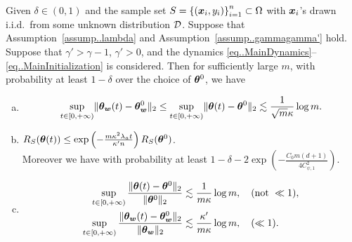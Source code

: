 \documentclass[twoside,11pt]{article}
\begin{document}
\begin{prop}\label{prop..WLazyRegime}
    Given $\delta\in(0,1)$ and the sample set $S = {\{(\bm{x}_i, y_i)\}}_{i=1}^n\subset\Omega$ with $\bm{x}_i$'s drawn i.i.d.\ from some unknown distribution $\mathcal{D}$. Suppose that Assumption~\ref{assump..lambda} and Assumption~\ref{assump..gammagamma'} hold.  Suppose that $\gamma'>\gamma-1$, $\gamma'>0$, and the dynamics \eqref{eq..MainDynamics}--\eqref{eq..MainInitialization} is considered. Then for sufficiently large $m$, with probability at least $1-\delta$ over the choice of $\bm{\theta}^0$, we have
    \begin{enumerate}[(a)]
        \item \begin{equation*}
                  \begin{aligned}
                      \sup\limits_{t\in[0,+\infty)}\lVert\bm{\theta}_{\bm{w}}(t)-\bm{\theta}_{\bm{w}}^0\rVert_2
                      \leq \sup\limits_{t\in[0,+\infty)}\lVert\bm{\theta}(t)-\bm{\theta}^0\rVert_2
                      \lesssim\frac{1}{\sqrt{m}\kappa}\log m.
                  \end{aligned}
              \end{equation*}
        \item $R_S(\bm{\theta}(t))\leq\exp\left(-\frac{m\kappa^2\lambda_a t}{\kappa'n}\right)R_S(\bm{\theta}^0)$. \\
              Moreover we have with probability at least $1-\delta-2\exp\left(-\frac{C_0m(d+1)}{4C_{\psi,1}^2}\right)$.
        \item \begin{equation*}
                  \begin{aligned}
                      \sup\limits_{t\in[0,+\infty)}\frac{\lVert\bm{\theta}(t)-\bm{\theta}^0\rVert_2}{\lVert\bm{\theta}^0\rVert_2}
                       & \lesssim\frac{1}{m\kappa}\log m, \quad (\text{not }\ll 1), \\
                      \sup\limits_{t\in[0,+\infty)}\frac{\lVert\bm{\theta}_{\bm{w}}(t)-\bm{\theta}_{\bm{w}}^0\rVert_2}{\lVert\bm{\theta}_{\bm{w}}\rVert_2}
                       & \lesssim\frac{\kappa'}{m\kappa}\log m, \quad (\ll 1).
                  \end{aligned}
              \end{equation*}
    \end{enumerate}
\end{prop}
\end{document}
